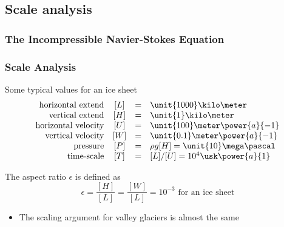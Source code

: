 \documentclass[hide notes,intlimits]{beamer}
\begin{document}
 
\subsection{Scale analysis}

\begin{frame}
  \frametitle{The Incompressible Navier-Stokes Equation}
\end{frame}
 

\begin{frame}
  \frametitle{Scale Analysis}
  \begin{block}{Some typical values for an ice sheet}
  \begin{equation*}
  \begin{array}{rccl}
    \text{horizontal extend} &  [L] & = & \unit{1000}\kilo\meter\\
    \text{vertical extend} & [H] & = & \unit{1}\kilo\meter \\
    \text{horizontal velocity} & [U] & = & \unit{100}\meter\power{a}{-1}\\
    \text{vertical velocity} & [W] & = & \unit{0.1}\meter\power{a}{-1}\\
    \text{pressure} & [P] & = & \rho g[H] = \unit{10}\mega\pascal\\
    \text{time-scale} & [T] & = &[L]/[U] = 10^{4}\usk\power{a}{1}\\
  \end{array}
  \end{equation*}
  \end{block}
  The aspect ratio $\epsilon$ is defined as
  \begin{equation*}
    \epsilon = \frac{[H]}{[L]} = \frac{[W]}{[L]} = 10^{-3} \text{ for an ice sheet}
  \end{equation*}
  \begin{itemize}
    \item The scaling argument for valley glaciers is almost the same
  \end{itemize}
\end{frame}
\end{document}
